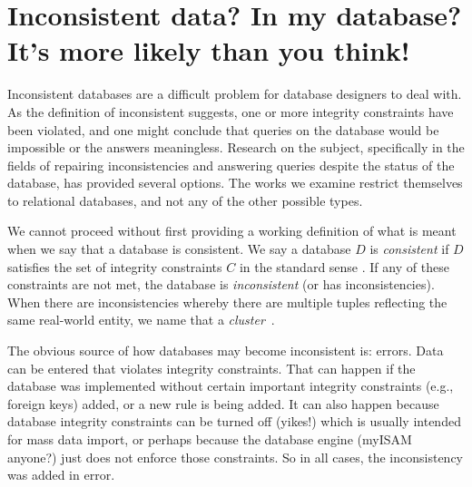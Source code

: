 




\section*{Inconsistent data? In my database? It's more likely than you think!}

Inconsistent databases are a difficult problem for database designers to deal with. As the definition of inconsistent suggests, one or more integrity constraints have been violated, and one might conclude that queries on the database would be impossible or the answers meaningless. Research on the subject, specifically in the fields of repairing inconsistencies and answering queries despite the status of the database, has provided several options. The works we examine restrict themselves to relational databases, and not any of the other possible types.

We cannot proceed without first providing a working definition of what is meant when we say that a database is consistent. We say a database $D$ is \textit{consistent} if $D$ satisfies the set of integrity constraints $C$ in the standard sense \cite{CQI}. If any of these constraints are not met, the database is \textit{inconsistent} (or has inconsistencies). When there are inconsistencies whereby there are multiple tuples reflecting the same real-world entity, we name that a \textit{cluster}~\cite{CA}.

The obvious source of how databases may become inconsistent is: errors. Data can be entered that violates integrity constraints. That can happen if the database was implemented without certain important integrity constraints (e.g., foreign keys) added, or a new rule is being added. It can also happen because database integrity constraints can be turned off (yikes!) which is usually intended for mass data import, or perhaps because the database engine (myISAM anyone?) just does not enforce those constraints. So in all cases, the inconsistency was added in error. 

